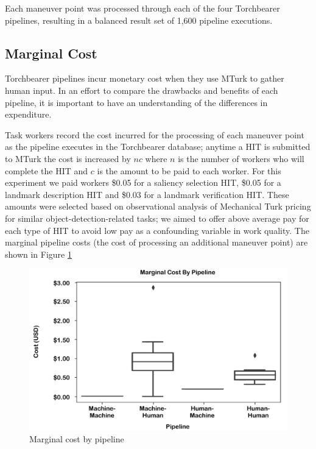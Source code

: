 Each maneuver point was processed through each of the four Torchbearer pipelines, resulting in a balanced result set of 1,600 pipeline executions.

\subsection{Marginal Cost}

Torchbearer pipelines incur monetary cost when they use MTurk to gather human input. In an effort to compare the drawbacks and benefits of each pipeline, it is important to have an understanding of the differences in expenditure.

Task workers record the cost incurred for the processing of each maneuver point as the pipeline executes in the Torchbearer database; anytime a HIT is submitted to MTurk the cost is increased by $nc$ where $n$ is the number of workers who will complete the HIT and $c$ is the amount to be paid to each worker. For this experiment we paid workers \$0.05 for a saliency selection HIT, \$0.05 for a landmark description HIT and \$0.03 for a landmark verification HIT. These amounts were selected based on observational analysis of Mechanical Turk pricing for similar object-detection-related tasks; we aimed to offer above average pay for each type of HIT to avoid low pay as a confounding variable in work quality. The marginal pipeline costs (the cost of processing an additional maneuver point) are shown in Figure \ref{fig:plot:cost}

\begin{figure}[htbp]
  \centering
  \includegraphics[width=\textwidth]{images/plot_cost.pdf}
  \caption{Marginal cost by pipeline}
  \label{fig:plot:cost}
\end{figure}

